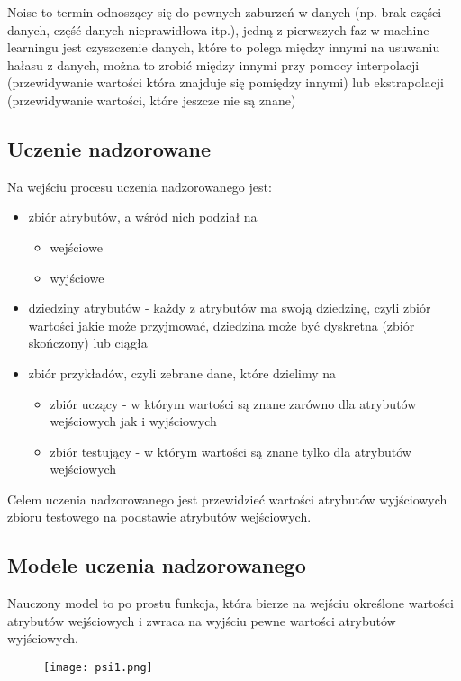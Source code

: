 \documentclass[a4paper,15pt]{article}
\begin{document}
Noise to termin odnoszący się do pewnych zaburzeń w danych (np. brak części danych, część danych nieprawidłowa itp.), jedną z pierwszych faz w machine learningu jest czyszczenie danych, które to polega między innymi na usuwaniu hałasu z danych, można to zrobić między innymi przy pomocy interpolacji (przewidywanie wartości która znajduje się pomiędzy innymi) lub ekstrapolacji (przewidywanie wartości, które jeszcze nie są znane)


\subsection{Uczenie nadzorowane}

Na wejściu procesu uczenia nadzorowanego jest:
\begin{itemize}
\item zbiór atrybutów, a wśród nich podział na
\begin{itemize}
\item wejściowe
\item wyjściowe
\end{itemize}
\item dziedziny atrybutów - każdy z atrybutów ma swoją dziedzinę, czyli zbiór wartości jakie może przyjmować, dziedzina może być dyskretna (zbiór skończony) lub ciągła
\item zbiór przykładów, czyli zebrane dane, które dzielimy na
\begin{itemize}
\item zbiór uczący - w którym wartości są znane zarówno dla atrybutów wejściowych jak i wyjściowych
\item zbiór testujący - w którym wartości są znane tylko dla atrybutów wejściowych
\end{itemize}
\end{itemize}
Celem uczenia nadzorowanego jest przewidzieć wartości atrybutów wyjściowych zbioru testowego na podstawie atrybutów wejściowych. 


\subsection{Modele uczenia nadzorowanego}

Nauczony model to po prostu funkcja, która bierze na wejściu określone wartości atrybutów wejściowych i zwraca na wyjściu pewne wartości atrybutów wyjściowych. 

\begin{figure}[H]
\centerline{\texttt{[image: psi1.png]}}
\end{figure}
\end{document}
